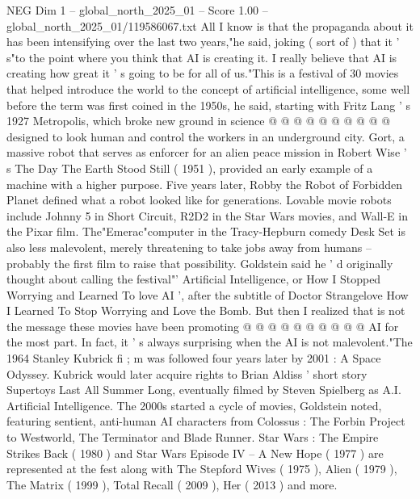 \begin{textsample}{NEG Dim 1 – global\_north\_2025\_01 – Score 1.00 – global\_north\_2025\_01/119586067.txt}
All I know is that the propaganda about it has been intensifying over the last two years,"he said, joking ( sort of ) that it ' s"to the point where you think that AI is creating it.
I really believe that AI is creating how great it ' s going to be for all of us."This is a festival of 30 movies that helped introduce the world to the concept of artificial intelligence, some well before the term was first coined in the 1950s, he said, starting with Fritz Lang ' s 1927 Metropolis, which broke new ground in science @ @ @ @ @ @ @ @ @ @ designed to look human and control the workers in an underground city.
Gort, a massive robot that serves as enforcer for an alien peace mission in Robert Wise ' s The Day The Earth Stood Still ( 1951 ), provided an early example of a machine with a higher purpose.
Five years later, Robby the Robot of Forbidden Planet defined what a robot looked like for generations.
Lovable movie robots include Johnny 5 in Short Circuit, R2D2 in the Star Wars movies, and Wall-E in the Pixar film.
The"Emerac"computer in the Tracy-Hepburn comedy Desk Set is also less malevolent, merely threatening to take jobs away from humans -- probably the first film to raise that possibility.
Goldstein said he ' d originally thought about calling the festival"' Artificial Intelligence, or How I Stopped Worrying and Learned To love AI ', after the subtitle of Doctor Strangelove How I Learned To Stop Worrying and Love the Bomb.
But then I realized that is not the message these movies have been promoting @ @ @ @ @ @ @ @ @ @ AI for the most part.
In fact, it ' s always surprising when the AI is not malevolent."The 1964 Stanley Kubrick fi ; m was followed four years later by 2001 : A Space Odyssey.
Kubrick would later acquire rights to Brian Aldiss ' short story Supertoys Last All Summer Long, eventually filmed by Steven Spielberg as A.I.
Artificial Intelligence.
The 2000s started a cycle of movies, Goldstein noted, featuring sentient, anti-human AI characters from Colossus : The Forbin Project to Westworld, The Terminator and Blade Runner.
Star Wars : The Empire Strikes Back ( 1980 ) and Star Wars Episode IV -- A New Hope ( 1977 ) are represented at the fest along with The Stepford Wives ( 1975 ), Alien ( 1979 ), The Matrix ( 1999 ), Total Recall ( 2009 ), Her ( 2013 ) and more.

\end{textsample}
